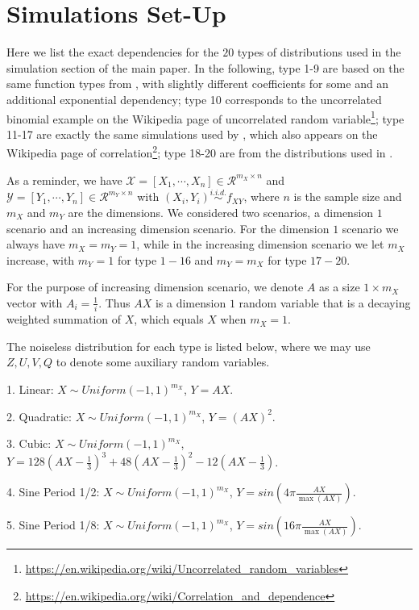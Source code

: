 \documentclass[12pt]{article}
\begin{document}
\section{Simulations Set-Up}
Here we list the exact dependencies for the $20$ types of distributions used in the simulation section of the main paper. In the following, type 1-9 are based on the same function types from \cite{SimonTibshirani2012}, with slightly different coefficients for some and an additional exponential dependency; type 10 corresponds to the uncorrelated binomial example on the Wikipedia page of uncorrelated random variable\footnote{\url{https://en.wikipedia.org/wiki/Uncorrelated_random_variables}}; type 11-17 are exactly the same simulations used by \cite{GorfineHellerHeller2012}, which also appears on the Wikipedia page of correlation\footnote{\url{https://en.wikipedia.org/wiki/Correlation_and_dependence}}; type 18-20 are from the distributions used in \cite{SzekelyRizzoBakirov2007}.

As a reminder, we have $\mathcal{X}=[X_{1},\cdots, X_{n}] \in \mathcal{R}^{m_{X} \times n}$ and $\mathcal{Y}=[Y_{1},\cdots, Y_{n}] \in \mathcal{R}^{m_{Y} \times n}$ with $(X_{i}, Y_{i}) \stackrel{i.i.d.}{\sim} f_{XY}$, where $n$ is the sample size and $m_{X}$ and $m_{Y}$ are the dimensions. We considered two scenarios, a dimension $1$ scenario and an increasing dimension scenario. For the dimension $1$ scenario we always have $m_{X}=m_{Y}=1$, while in the increasing dimension scenario we let $m_{X}$ increase, with $m_{Y}=1$ for type $1-16$ and $m_{Y}=m_{X}$ for type $17-20$. 

For the purpose of increasing dimension scenario, we denote $A$ as a size $1 \times m_{X}$ vector with $A_{i}=\frac{1}{i}$. Thus $AX$ is a dimension $1$ random variable that is a decaying weighted summation of $X$, which equals $X$ when $m_{X}=1$.
 
The noiseless distribution for each type is listed below, where we may use $Z, U, V, Q$ to denote some auxiliary random variables.

1. Linear: $X \sim Uniform(-1,1)^{m_{X}}$, $Y=AX$. 

2. Quadratic: $X \sim Uniform(-1,1)^{m_{X}}$, $Y=(AX)^2$.

3. Cubic: $X \sim Uniform(-1,1)^{m_{X}}$, $Y=128(AX-\frac{1}{3})^3+48(AX-\frac{1}{3})^2-12(AX-\frac{1}{3})$.

4. Sine Period 1/2: $X \sim Uniform(-1,1)^{m_{X}}$, $Y=sin(4\pi \frac{AX}{\max(AX)})$.

5. Sine Period 1/8: $X \sim Uniform(-1,1)^{m_{X}}$, $Y=sin(16\pi \frac{AX}{\max(AX)})$.    
\end{document}
